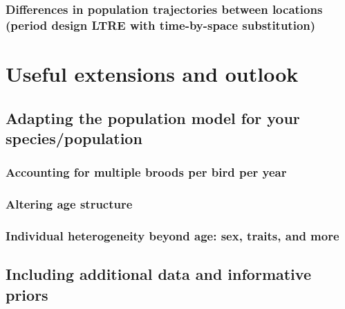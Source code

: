 \documentclass[
]{book}
\begin{document}
\hypertarget{differences-in-population-trajectories-between-locations-period-design-ltre-with-time-by-space-substitution}{%
\subsection{Differences in population trajectories between locations (period design LTRE with time-by-space substitution)}\label{differences-in-population-trajectories-between-locations-period-design-ltre-with-time-by-space-substitution}}

\hypertarget{ExtOutlook}{%
\chapter{Useful extensions and outlook}\label{ExtOutlook}}

\hypertarget{adapting-the-population-model-for-your-speciespopulation}{%
\section{Adapting the population model for your species/population}\label{adapting-the-population-model-for-your-speciespopulation}}

\hypertarget{accounting-for-multiple-broods-per-bird-per-year}{%
\subsection{Accounting for multiple broods per bird per year}\label{accounting-for-multiple-broods-per-bird-per-year}}

\hypertarget{altering-age-structure}{%
\subsection{Altering age structure}\label{altering-age-structure}}

\hypertarget{individual-heterogeneity-beyond-age-sex-traits-and-more}{%
\subsection{Individual heterogeneity beyond age: sex, traits, and more}\label{individual-heterogeneity-beyond-age-sex-traits-and-more}}

\hypertarget{including-additional-data-and-informative-priors}{%
\section{Including additional data and informative priors}\label{including-additional-data-and-informative-priors}}
\end{document}
